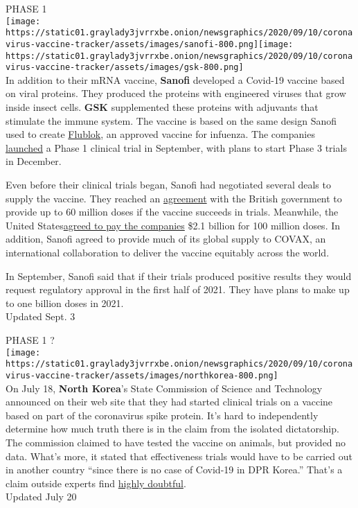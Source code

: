 PHASE 1\\
\texttt{[image: https://static01.graylady3jvrrxbe.onion/newsgraphics/2020/09/10/coronavirus-vaccine-tracker/assets/images/sanofi-800.png]}\texttt{[image: https://static01.graylady3jvrrxbe.onion/newsgraphics/2020/09/10/coronavirus-vaccine-tracker/assets/images/gsk-800.png]}\\
In addition to their mRNA vaccine, \textbf{\textbf{Sanofi}} developed a
Covid-19 vaccine based on viral proteins. They produced the proteins
with engineered viruses that grow inside insect cells.
\textbf{\textbf{GSK}} supplemented these proteins with adjuvants that
stimulate the immune system. The vaccine is based on the same design
Sanofi used to create
\href{https://sanofiflu.com/flublok-quadrivalent-influenza-vaccine.html}{Flublok},
an approved vaccine for infuenza. The companies
\href{https://www.sanofi.com/en/media-room/press-releases/2020/2020-09-03-07-00-00}{launched}
a Phase 1 clinical trial in September, with plans to start Phase 3
trials in December.

Even before their clinical trials began, Sanofi had negotiated several
deals to supply the vaccine. They reached an
\href{https://www.sanofi.com/en/media-room/press-releases/2020/2020-07-29-07-00-00}{agreement}
with the British government to provide up to 60 million doses if the
vaccine succeeds in trials. Meanwhile, the United
States\href{https://www.nytimes3xbfgragh.onion/2020/07/31/health/covid-19-vaccine-sanofi-gsk.html}{agreed
to pay the companies} \$2.1 billion for 100 million doses. In addition,
Sanofi agreed to provide much of its global supply to COVAX, an
international collaboration to deliver the vaccine equitably across the
world.

In September, Sanofi said that if their trials produced positive results
they would request regulatory approval in the first half of 2021. They
have plans to make up to one billion doses in 2021.\\
Updated Sept. 3

PHASE 1 ?\\
\texttt{[image: https://static01.graylady3jvrrxbe.onion/newsgraphics/2020/09/10/coronavirus-vaccine-tracker/assets/images/northkorea-800.png]}\\
On July 18, \textbf{\textbf{North Korea}}'s State Commission of Science
and Technology announced on their web site that they had started
clinical trials on a vaccine based on part of the coronavirus spike
protein. It's hard to independently determine how much truth there is in
the claim from the isolated dictatorship. The commission claimed to have
tested the vaccine on animals, but provided no data. What's more, it
stated that effectiveness trials would have to be carried out in another
country ``since there is no case of Covid-19 in DPR Korea.'' That's a
claim outside experts find
\href{https://www.nytimes3xbfgragh.onion/2020/03/31/world/asia/north-korea-coronavirus.html}{highly
doubtful}.\\
Updated July 20

